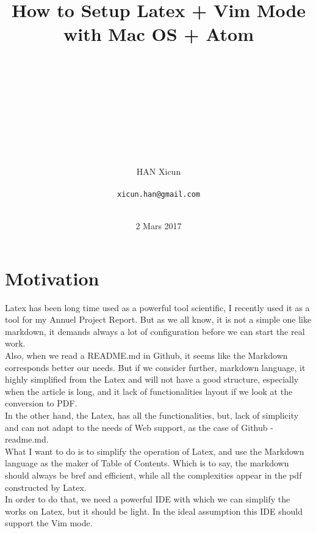 \documentclass[12pt,a4paper]{article}
\title{How to Setup Latex + Vim Mode with Mac OS + Atom}
\author{\\\\\\\\\\\\\\\\\\HAN Xicun\\\\
\texttt{xicun.han@gmail.com}\\\\}
\date{2 Mars 2017}
\begin{document}
	\pagestyle{empty}
	\maketitle
	\thispagestyle{empty}
	\clearpage

	\tableofcontents
	\newpage
	\renewcommand\listoflistingscaption{List of source codes}
	\listoflistings

	\thispagestyle{empty}
	\newpage
	\pagestyle{fancy}
	\lhead{}
	\chead{}
	\pagebreak
	\FloatBarrier



\section{Motivation}

Latex has been long time used as a powerful tool scientific, I recently used it as a tool for my Annuel Project Report. But as we all know, it is not a simple one like markdown, it demands always a lot of configuration  before we can start the real work. \\

Also, when we read a README.md in Github, it seems like the Markdown corresponds better our needs. But if we consider further, markdown language, it highly simplified from the Latex and will not have a good structure, especially when the article is long, and it lack of functionalities layout if we look at the conversion to PDF. \\

In the other hand, the Latex, has all the functionalities, but, lack of simplicity and can not adapt to the needs of Web support, as the case of Github - readme.md.\\

What I want to do is to simplify the operation of Latex, and use the Markdown language as the maker of Table of Contents. Which is to say, the markdown should always be bref and efficient, while all the complexities appear in the pdf constructed by Latex.\\

In order to do that, we need a powerful IDE with which we can simplify the works on Latex, but it should be light. In the ideal assumption this IDE should support the Vim mode.\\
\end{document}
